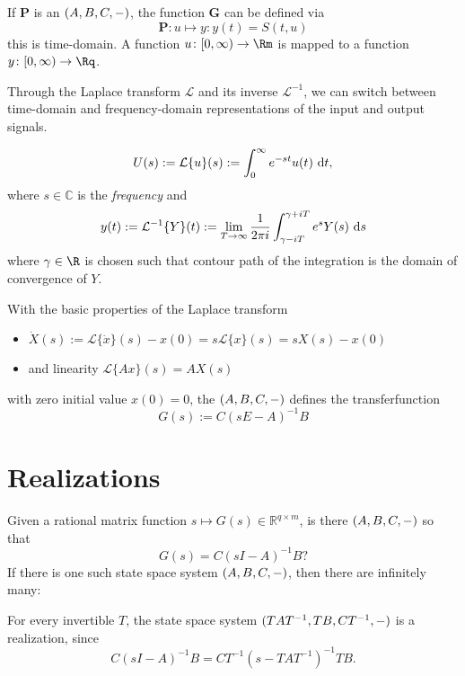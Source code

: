 \documentclass[a4paper,10pt]{article}
\begin{document}
If $\mathbf P$ is an $(A,B,C,-)$, the function $\mathbf G$ can be defined via 
\begin{equation*}
	\mathbf P \colon u \mapsto y\colon y(t) = S(t, u)
\end{equation*}
this is time-domain. A function $u \colon [0, \infty) \to \Rm$ is mapped to a function $y\colon [0, \infty)  \to \Rq$.

Through the Laplace transform $\mathcal L$ and its inverse $\mathcal L^{-1}$, we can switch between time-domain and frequency-domain representations of the input and output signals.

\begin{equation*}
	U(s) := \mathcal L\{u\}(s) := \int_0^\infty e^{-st}u(t)\text{~\textup{d}} t,
\end{equation*}
where $s\in \mathbb C$ is the \emph{frequency} and
\begin{equation*}
	y(t) := \mathcal L^{-1}\{Y\}(t) := \lim_{T\to \infty} \frac 1{2\pi i} \int_{\gamma - iT}^{\gamma + iT} e^{s}Y(s)\text{~\textup{d}} s
\end{equation*}
where $\gamma \in \R$ is chosen such that contour path of the integration is the domain of convergence of $Y$.

With the basic properties of the Laplace transform
\begin{itemize}
	\item $\dot X(s):= \mathcal L\{\dot x\}(s) -x(0)= s\mathcal L\{x\}(s) = s X(s)-x(0)$
	\item and linearity $\mathcal L\{Ax\}(s) = AX(s)$
\end{itemize}
with zero initial value $x(0) = 0$, the $(A,B,C,-)$ defines the transferfunction
\begin{equation*}
	G(s) := C(sE-A)^{-1}B
\end{equation*}

\section{Realizations}
Given a rational matrix function $s\mapsto G(s)\in \mathbb R^{q\times m}$, is there $(A,B,C,-)$ so that 
\begin{equation*}
	G(s) = C(sI-A)^{-1}B ?
\end{equation*}
If there is one such state space system $(A,B,C,-)$, then there are infinitely many:

For every invertible $T$, the state space system $(TAT^{-1},TB,CT^{-1},-)$ is a realization, since
\begin{equation*}
	C(sI-A)^{-1}B = CT^{-1}(s-TAT^{-1})^{-1}TB.
\end{equation*}
\end{document}

